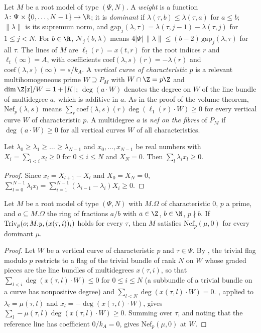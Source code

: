 Let $M$ be a root model of type $(\Psi,N)$. A \emph{weight} is a function $\lambda\colon\Psi\times\{0,\dots,N-1\}\to\R$;
it is \emph{dominant} if $\lambda(\tau,b)\le\lambda(\tau,a)$ for $a\le b$; $\|\lambda\|$ is its supremum norm, and
$\mathrm{gap}_j(\lambda,\tau)=\lambda(\tau,j-1)-\lambda(\tau,j)$ for $1\le j<N$. For $b\in\R$, $\mathcal N_j(b,\lambda)$
means $4|\Psi|\,\|\lambda\|\le(b-2)\,\mathrm{gap}_j(\lambda,\tau)$ for all $\tau$. The lines of $M$ are
$\ell_t(r)=x(t,r)$ for the root indices $r$ and $\ell_t(\infty)=A$, with coefficients
$\mathrm{coef}(\lambda,s)(r)=-\lambda(r)$ and $\mathrm{coef}(\lambda,s)(\infty)=s/k_A$. A \emph{vertical curve of
characteristic $p$} is a relevant multihomogeneous prime $W\supseteq P_M$ with $W\cap\Z=p\Z$ and
$\dim\Z[x]/W=1+|K|$; $\deg(a\cdot W)$ denotes the degree on $W$ of the line bundle of multidegree $a$, which is
additive in $a$. As in the proof of the volume theorem, $\mathrm{Nef}_p(\lambda,s)$ means
$\sum_r\mathrm{coef}(\lambda,s)(r)\deg(\ell_1(r)\cdot W)\ge0$ for every vertical curve $W$ of characteristic $p$.
A multidegree $a$ is \emph{nef on the fibres} of $P_M$ if $\deg(a\cdot W)\ge0$ for all vertical curves $W$ of all
characteristics.

\begin{lemma}\label{pf:towergeo:abel}
Let $\lambda_0\ge\lambda_1\ge\dots\ge\lambda_{N-1}$ and $x_0,\dots,x_{N-1}$ be real numbers with
$X_i=\sum_{l<i}x_l\ge0$ for $0\le i\le N$ and $X_N=0$. Then $\sum_l\lambda_lx_l\ge0$.
\end{lemma}

\begin{proof}
Since $x_l=X_{l+1}-X_l$ and $X_0=X_N=0$,
$\sum_{l=0}^{N-1}\lambda_lx_l=\sum_{i=1}^{N-1}(\lambda_{i-1}-\lambda_i)X_i\ge0$.
\end{proof}

\begin{lemma}\label{pf:towergeo:trivnef}
Let $M$ be a root model of type $(\Psi,N)$ with $M.\Omega$ of characteristic $0$, $p$ a prime, and $o\subseteq M.\Omega$
the ring of fractions $a/b$ with $a\in\Z$, $b\in\N$, $p\nmid b$. If $\mathrm{Triv}_p(o;M.y,(x(\tau,i))_i)$ holds for
every $\tau$, then $M$ satisfies $\mathrm{Nef}_p(\mu,0)$ for every dominant $\mu$.
\end{lemma}

\begin{proof}
Let $W$ be a vertical curve of characteristic $p$ and $\tau\in\Psi$. By
, the trivial flag modulo $p$ restricts to a flag of the trivial
bundle of rank $N$ on $W$ whose graded pieces are the line bundles of multidegrees $x(\tau,i)$, so that
$\sum_{l<i}\deg(x(\tau,l)\cdot W)\le0$ for $0\le i\le N$ (a subbundle of a trivial bundle on a curve has
nonpositive degree) and $\sum_{l<N}\deg(x(\tau,l)\cdot W)=0$. , applied to
$\lambda_l=\mu(\tau,l)$ and $x_l=-\deg(x(\tau,l)\cdot W)$, gives $\sum_l-\mu(\tau,l)\deg(x(\tau,l)\cdot W)\ge0$.
Summing over $\tau$, and noting that the reference line has coefficient $0/k_A=0$, gives $\mathrm{Nef}_p(\mu,0)$
at $W$.
\end{proof}

